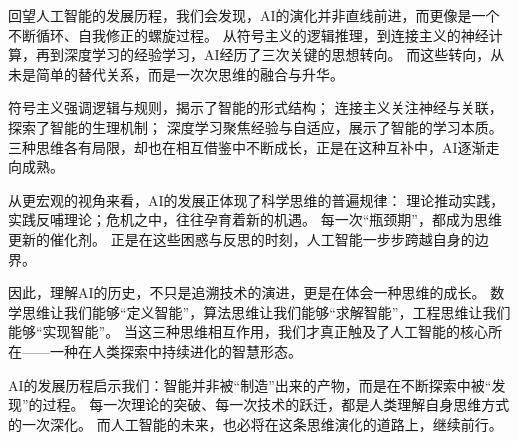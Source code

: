回望人工智能的发展历程，我们会发现，AI的演化并非直线前进，而更像是一个不断循环、自我修正的螺旋过程。  
从符号主义的逻辑推理，到连接主义的神经计算，再到深度学习的经验学习，AI经历了三次关键的思想转向。  
而这些转向，从未是简单的替代关系，而是一次次思维的融合与升华。

符号主义强调逻辑与规则，揭示了智能的形式结构；  
连接主义关注神经与关联，探索了智能的生理机制；  
深度学习聚焦经验与自适应，展示了智能的学习本质。  
三种思维各有局限，却也在相互借鉴中不断成长，正是在这种互补中，AI逐渐走向成熟。

从更宏观的视角来看，AI的发展正体现了科学思维的普遍规律：  
理论推动实践，实践反哺理论；危机之中，往往孕育着新的机遇。  
每一次“瓶颈期”，都成为思维更新的催化剂。  
正是在这些困惑与反思的时刻，人工智能一步步跨越自身的边界。

因此，理解AI的历史，不只是追溯技术的演进，更是在体会一种思维的成长。  
数学思维让我们能够“定义智能”，算法思维让我们能够“求解智能”，工程思维让我们能够“实现智能”。  
当这三种思维相互作用，我们才真正触及了人工智能的核心所在——一种在人类探索中持续进化的智慧形态。

AI的发展历程启示我们：智能并非被“制造”出来的产物，而是在不断探索中被“发现”的过程。  
每一次理论的突破、每一次技术的跃迁，都是人类理解自身思维方式的一次深化。  
而人工智能的未来，也必将在这条思维演化的道路上，继续前行。

